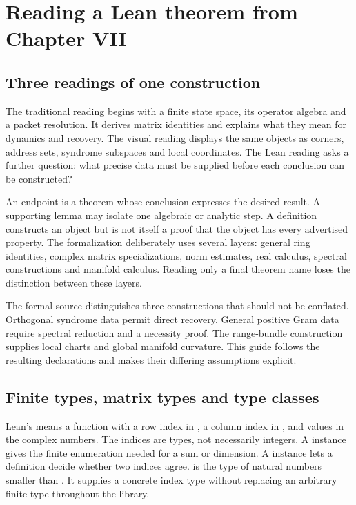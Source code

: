 \section{Reading a Lean theorem from Chapter VII}
\label{sec:reading}

\subsection{Three readings of one construction}
The traditional reading begins with a finite state space, its operator algebra and a packet resolution. It derives matrix identities and explains what they mean for dynamics and recovery. The visual reading displays the same objects as corners, address sets, syndrome subspaces and local coordinates. The Lean reading asks a further question: what precise data must be supplied before each conclusion can be constructed?

An endpoint is a theorem whose conclusion expresses the desired result. A supporting lemma may isolate one algebraic or analytic step. A definition constructs an object but is not itself a proof that the object has every advertised property. The formalization deliberately uses several layers: general ring identities, complex matrix specializations, norm estimates, real calculus, spectral constructions and manifold calculus. Reading only a final theorem name loses the distinction between these layers.

The formal source distinguishes three constructions that should not be conflated. Orthogonal syndrome data permit direct recovery. General positive Gram data require spectral reduction and a necessity proof. The range-bundle construction supplies local charts and global manifold curvature. This guide follows the resulting declarations and makes their differing assumptions explicit.

\subsection{Finite types, matrix types and type classes}
Lean's  means a function with a row index in , a column index in , and values in the complex numbers. The indices are types, not necessarily integers. A  instance gives the finite enumeration needed for a sum or dimension. A  instance lets a definition decide whether two indices agree.  is the type of natural numbers smaller than . It supplies a concrete index type without replacing an arbitrary finite type throughout the library.

